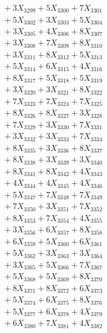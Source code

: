 \documentclass[a4paper,10pt]{article}
\begin{document}
{\begin{align}
&\;  + 3 X_{3299} + 5 X_{3300} + 7 X_{3301} \\[0.3ex]
&\;  + 5 X_{3302} + 3 X_{3303} + 5 X_{3304} \\[0.3ex]
&\;  + 3 X_{3305} + 4 X_{3306} + 8 X_{3307} \\[0.3ex]
&\;  + 3 X_{3308} + 7 X_{3309} + 8 X_{3310} \\[0.5ex]\allowbreak
&\;  + 3 X_{3311} + 8 X_{3312} + 5 X_{3313} \\[0.3ex]
&\;  + 5 X_{3314} + 6 X_{3315} + 4 X_{3316} \\[0.3ex]
&\;  + 8 X_{3317} + 5 X_{3318} + 5 X_{3319} \\[0.3ex]
&\;  + 3 X_{3320} + 3 X_{3321} + 8 X_{3322} \\[0.3ex]
&\;  + 7 X_{3323} + 7 X_{3324} + 7 X_{3325} \\[0.3ex]
&\;  + 8 X_{3326} + 8 X_{3327} + 3 X_{3328} \\[0.3ex]
&\;  + 7 X_{3329} + 3 X_{3330} + 7 X_{3331} \\[0.3ex]
&\;  + 3 X_{3332} + 3 X_{3333} + 7 X_{3334} \\[0.3ex]
&\;  + 8 X_{3335} + 3 X_{3336} + 8 X_{3337} \\[0.3ex]
&\;  + 8 X_{3338} + 3 X_{3339} + 3 X_{3340} \\[0.5ex]\allowbreak
&\;  + 8 X_{3341} + 8 X_{3342} + 4 X_{3343} \\[0.3ex]
&\;  + 4 X_{3344} + 4 X_{3345} + 4 X_{3346} \\[0.3ex]
&\;  + 5 X_{3347} + 7 X_{3348} + 7 X_{3349} \\[0.3ex]
&\;  + 7 X_{3350} + 3 X_{3351} + 7 X_{3352} \\[0.3ex]
&\;  + 8 X_{3353} + 7 X_{3354} + 4 X_{3355} \\[0.3ex]
&\;  + 3 X_{3356} + 6 X_{3357} + 8 X_{3358} \\[0.3ex]
&\;  + 6 X_{3359} + 5 X_{3360} + 6 X_{3361} \\[0.3ex]
&\;  + 5 X_{3362} + 3 X_{3363} + 3 X_{3364} \\[0.3ex]
&\;  + 3 X_{3365} + 5 X_{3366} + 7 X_{3367} \\[0.3ex]
&\;  + 5 X_{3368} + 5 X_{3369} + 8 X_{3370} \\[0.5ex]\allowbreak
&\;  + 8 X_{3371} + 8 X_{3372} + 6 X_{3373} \\[0.3ex]
&\;  + 5 X_{3374} + 6 X_{3375} + 8 X_{3376} \\[0.3ex]
&\;  + 5 X_{3377} + 6 X_{3378} + 4 X_{3379} \\[0.3ex]
&\;  + 6 X_{3380} + 7 X_{3381} + 4 X_{3382} \\[0.3ex]

\end{align}}
\end{document}
